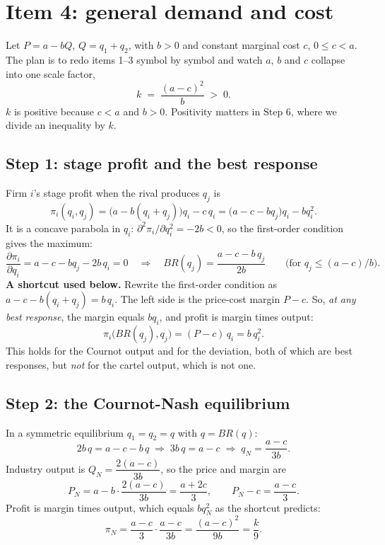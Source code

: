 \documentclass[11pt,a4paper]{article}
\begin{document}
\section{Item 4: general demand and cost}

Let $P = a - bQ$, $Q = q_1 + q_2$, with $b > 0$ and constant marginal cost $c$, $0 \le c < a$. The plan
is to redo items 1--3 symbol by symbol and watch $a$, $b$ and $c$ collapse into one scale factor,
\[
k \;=\; \frac{(a-c)^2}{b} \;>\; 0 .
\]
$k$ is positive because $c < a$ and $b > 0$. Positivity matters in Step 6, where we divide an
inequality by $k$.

\subsection*{Step 1: stage profit and the best response}

Firm $i$'s stage profit when the rival produces $q_j$ is
\[
\pi_i(q_i, q_j) = \bigl(a - b(q_i + q_j)\bigr)q_i - c\,q_i = \bigl(a - c - b q_j\bigr)q_i - b q_i^2 .
\]
It is a concave parabola in $q_i$: $\partial^2\pi_i/\partial q_i^2 = -2b < 0$, so the first-order
condition gives the maximum:
\[
\frac{\partial \pi_i}{\partial q_i} = a - c - b q_j - 2b\,q_i = 0
\quad\Longrightarrow\quad
BR(q_j) = \frac{a - c - b\,q_j}{2b} \qquad \bigl(\text{for } q_j \le (a-c)/b\bigr).
\]
\textbf{A shortcut used below.} Rewrite the first-order condition as
$a - c - b(q_i + q_j) = b\,q_i$. The left side is the price-cost margin $P - c$. So, \emph{at any best
response}, the margin equals $b q_i$, and profit is margin times output:
\[
\pi_i\bigl(BR(q_j), q_j\bigr) = (P - c)\,q_i = b\,q_i^2 .
\]
This holds for the Cournot output and for the deviation, both of which are best responses, but
\emph{not} for the cartel output, which is not one.

\subsection*{Step 2: the Cournot-Nash equilibrium}

In a symmetric equilibrium $q_1 = q_2 = q$ with $q = BR(q)$:
\[
2b\,q = a - c - b\,q \;\Longrightarrow\; 3b\,q = a - c \;\Longrightarrow\; q_N = \frac{a - c}{3b}.
\]
Industry output is $Q_N = \dfrac{2(a-c)}{3b}$, so the price and margin are
\[
P_N = a - b\cdot\frac{2(a-c)}{3b} = \frac{a + 2c}{3}, \qquad P_N - c = \frac{a - c}{3}.
\]
Profit is margin times output, which equals $b q_N^2$ as the shortcut predicts:
\[
\pi_N = \frac{a-c}{3}\cdot\frac{a-c}{3b} = \frac{(a-c)^2}{9b} = \frac{k}{9}.
\]
\end{document}
